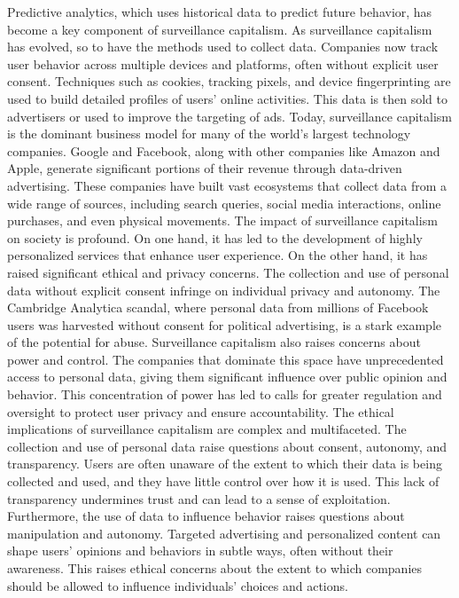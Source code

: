 Predictive analytics, which uses historical data to predict future behavior, has become a key component of surveillance capitalism.
As surveillance capitalism has evolved, so to have the methods used to collect data.
Companies now track user behavior across multiple devices and platforms, often without explicit user consent.
Techniques such as cookies, tracking pixels, and device fingerprinting are used to build detailed profiles of users' online activities.
This data is then sold to advertisers or used to improve the targeting of ads.
Today, surveillance capitalism is the dominant business model for many of the world's largest technology companies.
Google and Facebook, along with other companies like Amazon and Apple, generate significant portions of their revenue through data-driven advertising.
These companies have built vast ecosystems that collect data from a wide range of sources, including search queries, social media interactions, online purchases, and even physical movements.
The impact of surveillance capitalism on society is profound.
On one hand, it has led to the development of highly personalized services that enhance user experience.
On the other hand, it has raised significant ethical and privacy concerns.
The collection and use of personal data without explicit consent infringe on individual privacy and autonomy.
The Cambridge Analytica scandal, where personal data from millions of Facebook users was harvested without consent for political advertising, is a stark example of the potential for abuse.
Surveillance capitalism also raises concerns about power and control.
The companies that dominate this space have unprecedented access to personal data, giving them significant influence over public opinion and behavior.
This concentration of power has led to calls for greater regulation and oversight to protect user privacy and ensure accountability.
The ethical implications of surveillance capitalism are complex and multifaceted.
The collection and use of personal data raise questions about consent, autonomy, and transparency.
Users are often unaware of the extent to which their data is being collected and used, and they have little control over how it is used.
This lack of transparency undermines trust and can lead to a sense of exploitation.
Furthermore, the use of data to influence behavior raises questions about manipulation and autonomy.
Targeted advertising and personalized content can shape users' opinions and behaviors in subtle ways, often without their awareness.
This raises ethical concerns about the extent to which companies should be allowed to influence individuals' choices and actions.
